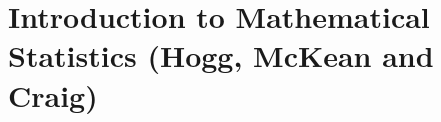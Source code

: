 \documentclass[a4paper]{ltjsreport}
\begin{document}
\chapter*{Introduction to Mathematical Statistics (Hogg, McKean and Craig)}

\printbibliography
\tableofcontents




\end{document}
